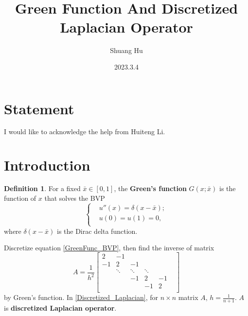 \documentclass{article}
\title{Green Function And Discretized Laplacian Operator}
\author{Shuang Hu}
\date{2023.3.4}
\theoremstyle{plain}
\theoremstyle{definition}
\newtheorem{defn}{Definition}[section]
\theoremstyle{remark}
\begin{document}
\maketitle
\section*{Statement}
I would like to acknowledge the help from Huiteng Li.
\section{Introduction}
\begin{defn}
For a fixed $\bar{x}\in [0,1]$, the \textbf{Green's function} $G(x;\bar{x})$ 
is the function of $x$ that solves the BVP
\begin{equation}
    \label{GreenFunc_BVP}
    \left\{
        \begin{aligned}
        &u''(x)=\delta(x-\bar{x});\\
        &u(0)=u(1)=0,\\
        \end{aligned}
    \right.
\end{equation}
where $\delta(x-\bar{x})$ is the Dirac delta function.
\end{defn}
Discretize equation \eqref{GreenFunc_BVP}, then find the inverse of matrix
\begin{equation}
    \label{Discretized_Laplacian}
    A=\frac{1}{h^2}\begin{bmatrix}
        2&-1&&&&\\
        -1&2&-1&&&\\
        &\ddots&\ddots&\ddots&&\\
        &&-1&2&-1&\\
        &&&-1&2&\\
    \end{bmatrix}
\end{equation}
by Green's function. In \eqref{Discretized_Laplacian}, for $n\times n$ matrix $A$, $h=\frac{1}{n+1}$. $A$ is \textbf{discretized Laplacian operator}. 
\end{document}
